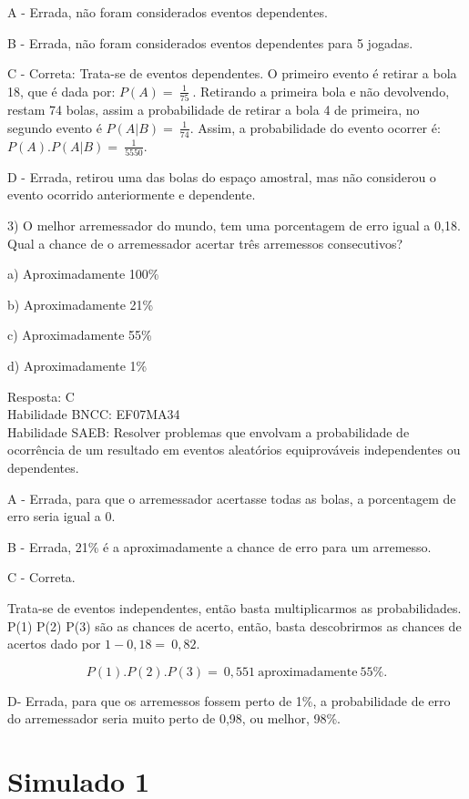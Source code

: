 A - Errada, não foram considerados eventos dependentes.

B - Errada, não foram considerados eventos dependentes para 5 jogadas.

C - Correta: Trata-se de eventos dependentes. O primeiro evento é
retirar a bola 18, que é dada por: \(P(A) = \ \frac{1}{75}\ \).
Retirando a primeira bola e não devolvendo, restam 74 bolas, assim a
probabilidade de retirar a bola 4 de primeira, no segundo evento é
\(P(A|B) = \ \frac{1}{74}\). Assim, a probabilidade do evento ocorrer é:
\(P(A).P(A|B) = \ \frac{1}{5550}\).

D - Errada, retirou uma das bolas do espaço amostral, mas não considerou
o evento ocorrido anteriormente e dependente.

3) O melhor arremessador do mundo, tem uma porcentagem de erro igual a
0,18. Qual a chance de o arremessador acertar três arremessos
consecutivos?

a) Aproximadamente 100\%

b) Aproximadamente 21\%

c) Aproximadamente 55\%

d) Aproximadamente 1\%

Resposta: C\\
Habilidade BNCC: EF07MA34\\
Habilidade SAEB: Resolver problemas que envolvam a probabilidade de
ocorrência de um resultado em eventos aleatórios equiprováveis
independentes ou dependentes.

A - Errada, para que o arremessador acertasse todas as bolas, a
porcentagem de erro seria igual a 0.

B - Errada, 21\% é a aproximadamente a chance de erro para um arremesso.

C - Correta.

Trata-se de eventos independentes, então basta multiplicarmos as
probabilidades. P(1) P(2) P(3) são as chances de acerto, então, basta
descobrirmos as chances de acertos dado por \(1 - 0,18 = \ 0,82.\)

\[P(1).P(2).P(3) = \ 0,551\ \text{aproximadamente}\ 55\%.\]

D- Errada, para que os arremessos fossem perto de 1\%, a probabilidade
de erro do arremessador seria muito perto de 0,98, ou melhor, 98\%.

\section{Simulado 1}

